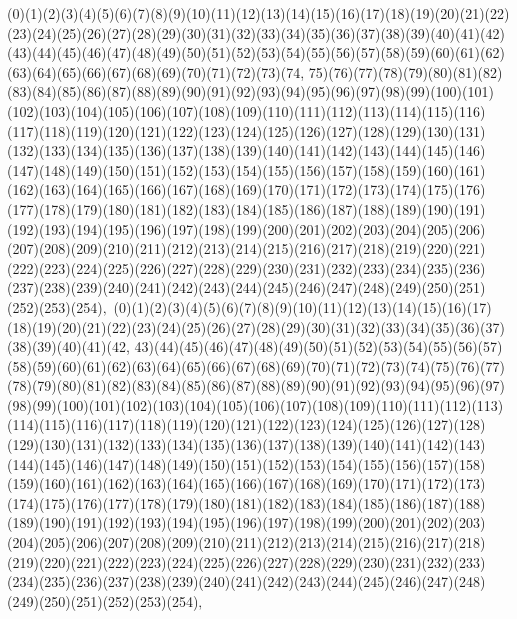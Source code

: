 \documentclass[12pt]{article}
\begin{document}
{(0)(1)(2)(3)(4)(5)(6)(7)(8)(9)(10)(11)(12)(13)(14)(15)(16)(17)(18)(19)(20)(21)(22)(23)(24)(25)(26)(27)(28)(29)(30)(31)(32)(33)(34)(35)(36)(37)(38)(39)(40)(41)(42)(43)(44)(45)(46)(47)(48)(49)(50)(51)(52)(53)(54)(55)(56)(57)(58)(59)(60)(61)(62)(63)(64)(65)(66)(67)(68)(69)(70)(71)(72)(73)(74, 75)(76)(77)(78)(79)(80)(81)(82)(83)(84)(85)(86)(87)(88)(89)(90)(91)(92)(93)(94)(95)(96)(97)(98)(99)(100)(101)(102)(103)(104)(105)(106)(107)(108)(109)(110)(111)(112)(113)(114)(115)(116)(117)(118)(119)(120)(121)(122)(123)(124)(125)(126)(127)(128)(129)(130)(131)(132)(133)(134)(135)(136)(137)(138)(139)(140)(141)(142)(143)(144)(145)(146)(147)(148)(149)(150)(151)(152)(153)(154)(155)(156)(157)(158)(159)(160)(161)(162)(163)(164)(165)(166)(167)(168)(169)(170)(171)(172)(173)(174)(175)(176)(177)(178)(179)(180)(181)(182)(183)(184)(185)(186)(187)(188)(189)(190)(191)(192)(193)(194)(195)(196)(197)(198)(199)(200)(201)(202)(203)(204)(205)(206)(207)(208)(209)(210)(211)(212)(213)(214)(215)(216)(217)(218)(219)(220)(221)(222)(223)(224)(225)(226)(227)(228)(229)(230)(231)(232)(233)(234)(235)(236)(237)(238)(239)(240)(241)(242)(243)(244)(245)(246)(247)(248)(249)(250)(251)(252)(253)(254)$
, 
$
(0)(1)(2)(3)(4)(5)(6)(7)(8)(9)(10)(11)(12)(13)(14)(15)(16)(17)(18)(19)(20)(21)(22)(23)(24)(25)(26)(27)(28)(29)(30)(31)(32)(33)(34)(35)(36)(37)(38)(39)(40)(41)(42, 43)(44)(45)(46)(47)(48)(49)(50)(51)(52)(53)(54)(55)(56)(57)(58)(59)(60)(61)(62)(63)(64)(65)(66)(67)(68)(69)(70)(71)(72)(73)(74)(75)(76)(77)(78)(79)(80)(81)(82)(83)(84)(85)(86)(87)(88)(89)(90)(91)(92)(93)(94)(95)(96)(97)(98)(99)(100)(101)(102)(103)(104)(105)(106)(107)(108)(109)(110)(111)(112)(113)(114)(115)(116)(117)(118)(119)(120)(121)(122)(123)(124)(125)(126)(127)(128)(129)(130)(131)(132)(133)(134)(135)(136)(137)(138)(139)(140)(141)(142)(143)(144)(145)(146)(147)(148)(149)(150)(151)(152)(153)(154)(155)(156)(157)(158)(159)(160)(161)(162)(163)(164)(165)(166)(167)(168)(169)(170)(171)(172)(173)(174)(175)(176)(177)(178)(179)(180)(181)(182)(183)(184)(185)(186)(187)(188)(189)(190)(191)(192)(193)(194)(195)(196)(197)(198)(199)(200)(201)(202)(203)(204)(205)(206)(207)(208)(209)(210)(211)(212)(213)(214)(215)(216)(217)(218)(219)(220)(221)(222)(223)(224)(225)(226)(227)(228)(229)(230)(231)(232)(233)(234)(235)(236)(237)(238)(239)(240)(241)(242)(243)(244)(245)(246)(247)(248)(249)(250)(251)(252)(253)(254)$
, 
$
}
\end{document}
